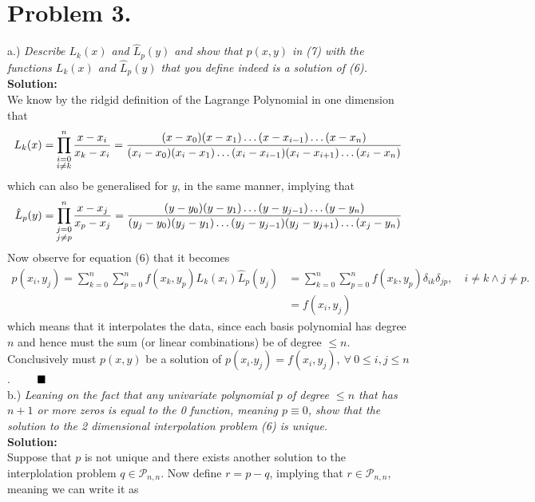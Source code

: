 \documentclass[12pt,
               a4paper,
               article,
               oneside,
               english,oldfontcommands]{memoir}
\newcommand{\Q}{ \qquad \hfill \blacksquare}
\newcommand{\spaze}{\vspace{4mm}\\}
\begin{document}
\section*{\centering Problem 3.}
a.) \emph{Describe $L_{k}(x)$ and $\hat{L}_{p}(y)$ and show that $p(x,y)$ in (7) with the functions $L_{k}(x)$ and $\hat{L}_{p}(y)$ that you define indeed is a solution of (6).} \spaze
 \textbf{Solution:} \spaze 
 We know by the ridgid definition of the Lagrange Polynomial in one dimension that 
 \begin{align*}
 L_{k}(x) =   \prod_{\mathclap{\substack{i = 0\\
                              i \neq k \\}}}^{n} \frac{x - x_{i}}{x_k - x_i} = \frac{(x - x_0) (x - x_1 )\ldots( x- x_{i-1}) \ldots (x - x_n)}{(x_i - x_0)(x_i - x_1) \ldots (x_i - x_{i-1}) (x_i - x_{i+1}) \ldots (x_i - x_n)}
 \end{align*}
 which can also be generalised for $y$, in the same manner, implying that 
 \begin{align*}
\hat{L}_{p}(y) =  \prod_{\mathclap{\substack{j= 0\\
                              j \neq p \\}}}^{n} \frac{x - x_j}{x_p - x_j} =\frac{(y - y_0) (y - y_1 )\ldots( y- y_{j-1}) \ldots (y - y_n)}{(y_j - y_0)(y_j - y_1) \ldots (y_j - y_{j-1}) (y_j - y_{j+1}) \ldots (x_j - y_n)}
 \end{align*}
 Now observe for equation (6) that it becomes 
 \begin{align*}
 p(x_i,y_j) = \sum_{k=0}^{n}  \sum_{p=0}^{n} f(x_k, y_p) L_{k}(x_i) \hat{L}_{p}(y_j) &= \sum_{k=0}^{n}  \sum_{p=0}^{n} f(x_k, y_p) \delta_{ik} \delta_{jp}, \quad i \neq k \land j\neq p. \\[5pt]
 &= f(x_i, y_j)
 \end{align*}
 which means that it interpolates the data, since each basis polynomial has degree $n$ and hence must the sum (or linear combinations) be of degree $\leq n$. Conclusively must $p(x,y)$ be a solution of $p(x_i. y_j) = f(x_i, y_j), \ \forall \ 0 \leq i,j \leq n$.  $\Q$ \spaze
b.) \emph{Leaning on the fact that any univariate polynomial $p$ of degree $ \leq n$ that has $n + 1$ or more zeros is equal to the 0 function, meaning $ p \equiv 0$, show that the solution to the 2 dimensional interpolation problem (6) is unique.}\spaze 
\textbf{Solution:} \spaze
Suppose that $p$ is not unique and there exists another solution to the interplolation problem $q \in \mathcal{P}_{n,n}$. Now define $r = p - q$, implying that $r \in \mathcal{P}_{n,n}$, meaning we can write it as 
\end{document}
